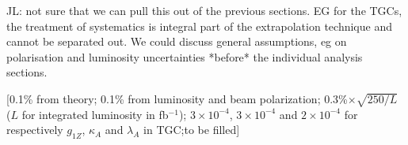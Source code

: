 {\color{red} JL: not sure that we can pull this out of the previous sections. EG for the TGCs, the treatment of systematics is integral part of the extrapolation technique and cannot be separated out. 
We could discuss general assumptions, eg on polarisation and luminosity uncertainties *before* the individual analysis sections.}

[0.1\% from theory; 0.1\% from luminosity and beam polarization; 0.3\%$\times\sqrt{250/L}$ ($L$ 
for integrated luminosity in fb$^{-1}$); $3\times10^{-4}$,
$3\times10^{-4}$ and
$2\times10^{-4}$ for respectively $g_{1Z}$, $\kappa_A$ and
$\lambda_A$ in TGC;to be filled]